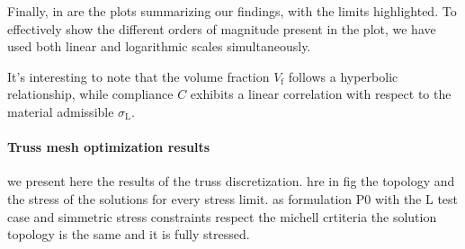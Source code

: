 Finally, in  are the plots summarizing our findings, with the limits highlighted. To effectively show the different orders of magnitude present in the plot, we have used both linear and logarithmic scales simultaneously.
\begin{figure}[]
    \hspace*{\fill}
    \hfill
    \hspace*{\fill}
    \caption{}
    \label{fig:03_to_plot}
\end{figure}
It's interesting to note that the volume fraction $V_\text{f}$ follows a hyperbolic relationship, while compliance $C$ exhibits a linear correlation with respect to the material admissible $\sigma_\text{L}$.

\paragraph{Truss mesh optimization results}
we present here the results of the truss discretization. hre in fig the topology and the stress of the solutions for every stress limit. as formulation P0 with the L test case and simmetric stress constraints respect the michell crtiteria the solution  topology is the same and it is fully stressed.

